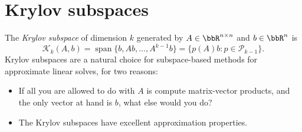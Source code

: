 \documentclass[12pt, leqno]{article} %
\begin{document}




\section{Krylov subspaces}

The {\em Krylov subspace} of dimension $k$ generated by
$A \in \bbR^{n \times n}$ and $b \in \bbR^n$ is
\[
  \mathcal{K}_k(A,b)
    = \operatorname{span}\{ b, Ab, \ldots, A^{k-1} b \}
    = \{ p(A) b : p \in \mathcal{P}_{k-1} \}.
\]
Krylov subspaces are a natural choice for subspace-based methods for
approximate linear solves, for two reasons:
\begin{itemize}
\item If all you are allowed to do with $A$ is compute matrix-vector
  products, and the only vector at hand is $b$, what else would you do?
\item The Krylov subspaces have excellent approximation properties.
\end{itemize}
\end{document}
